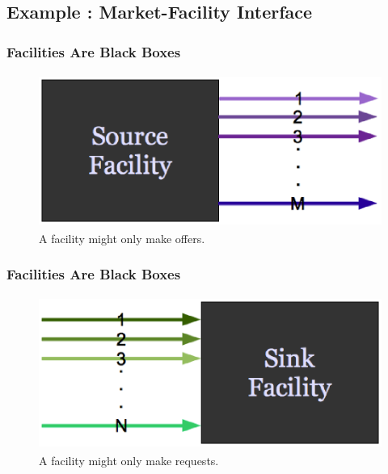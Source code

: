 \documentclass[9pt]{beamer}
\begin{document}
\subsection{Example : Market-Facility Interface}
\begin{frame}[ctb!]
  \frametitle{Facilities Are Black Boxes}
  \begin{figure}[htbp!]
    \begin{center}
      \includegraphics[height=5cm]{sourcefacility.eps}
    \end{center}
    \caption{ A facility might only make offers.} 
    \label{fig:sourcefacility}
  \end{figure}
\end{frame}
\begin{frame}[ctb!]
  \frametitle{Facilities Are Black Boxes}
  \begin{figure}[htbp!]
    \begin{center}
      \includegraphics[height=5cm]{sinkfacility.eps}
    \end{center}
    \caption{ A facility might only make requests.} 
    \label{fig:sinkfacility}
  \end{figure}
\end{frame}
\end{document}
